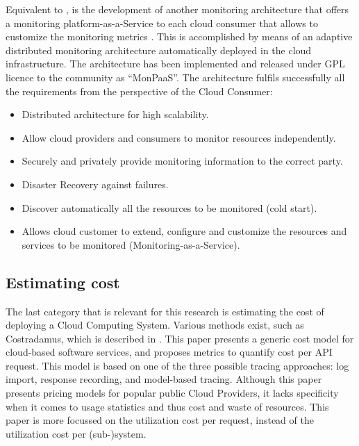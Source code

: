 Equivalent to \cite{aktas2018hybrid}, is the development of another monitoring architecture that offers a monitoring platform-as-a-Service to each cloud consumer that allows to customize the monitoring metrics \cite{calero2014monpaas}. This is accomplished by means of an adaptive distributed monitoring architecture automatically deployed in the cloud infrastructure. The architecture has been implemented and released under GPL licence to the community as ``MonPaaS''. The architecture fulfils successfully all the requirements from the perspective of the Cloud Consumer:
\begin{itemize}
    \item Distributed architecture for high scalability.
    \item Allow cloud providers and consumers to monitor resources independently.
    \item Securely and privately provide monitoring information to the correct party.
    \item Disaster Recovery against failures.
    \item Discover automatically all the resources to be monitored (cold start).
    \item Allows cloud customer to extend, configure and customize the resources and services to be monitored (Monitoring-as-a-Service).
\end{itemize}

\subsection{Estimating cost} \label{sec:estimating_cost}
The last category that is relevant for this research is estimating the cost of deploying a Cloud Computing System. Various methods exist, such as Costradamus, which is described in \cite{kuhlenkamp2017costradamus}. This paper presents a generic cost model for cloud-based software services, and proposes metrics to quantify cost per API request. This model is based on one of the three possible tracing approaches: log import, response recording, and model-based tracing. Although this paper presents pricing models for popular public Cloud Providers, it lacks specificity when it comes to usage statistics and thus cost and waste of resources. This paper is more focussed on the utilization cost per request, instead of the utilization cost per (sub-)system.\\


